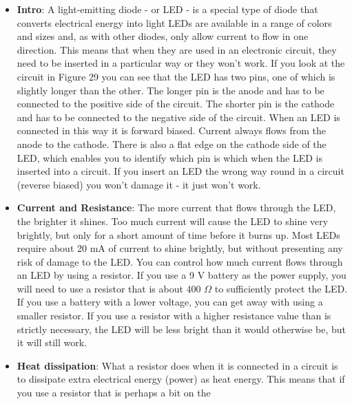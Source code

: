 \documentclass{report}
\begin{document}
    \pagebreak 
    \begin{itemize}
        \item \textbf{Intro}: A light-emitting diode - or LED - is a special type of diode that converts electrical energy into light 
            \bigbreak \noindent 
            LEDs are available in a range of colors and sizes and, as with other diodes, only allow current to flow in one direction. This means that when they are used in an electronic circuit, they need to be inserted in a particular way or they won't work.
            \bigbreak \noindent 
            \bigbreak \noindent 
            If you look at the circuit in Figure 29 you can see that the LED has two pins, one of which is slightly longer than the other. The longer pin is the anode and has to be connected to the positive side of the circuit. The shorter pin is the cathode and has to be connected to the negative side of the circuit. When an LED is connected in this way it is forward biased. Current always flows from the anode to the cathode. There is also a flat edge on the cathode side of the LED, which enables you to identify which pin is which when the LED is inserted into a circuit.
            \bigbreak \noindent 
            If you insert an LED the wrong way round in a circuit (reverse biased) you won't damage it - it just won't work.
        \item \textbf{Current and Resistance}: The more current that flows through the LED, the brighter it shines. Too much current will cause the LED to shine very brightly, but only for a short amount of time before it burns up. Most LEDs require about 20 mA of current to shine brightly, but without presenting any risk of damage to the LED.
            \bigbreak \noindent 
            You can control how much current flows through an LED by using a resistor. If you use a 9 V battery as the power supply, you will need to use a resistor that is about 400 $\Omega$ to sufficiently protect the LED. If you use a battery with a lower voltage, you can get away with using a smaller resistor. If you use a resistor with a higher resistance value than is strictly necessary, the LED will be less bright than it would otherwise be, but it will still work. 
        \item \textbf{Heat dissipation}: What a resistor does when it is connected in a circuit is to dissipate extra electrical energy (power) as heat energy. This means that if you use a resistor that is perhaps a bit on the
            \bigbreak \noindent 

\end{itemize}
\end{document}
